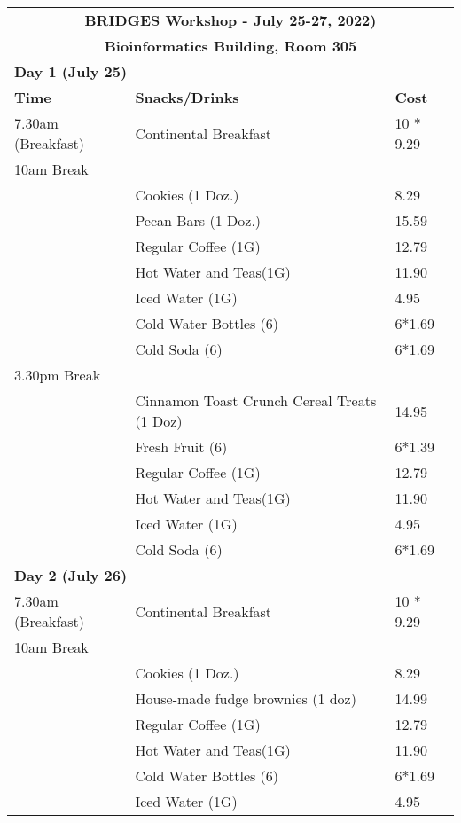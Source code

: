 \documentclass[11pt]{article}
\begin{document}
\begin{table}[htp]
{%
\begin{tabular}{lll} \hline
\multicolumn{3}{c}{\textbf{BRIDGES Workshop - July 25-27, 2022)}}\\ 
\multicolumn{3}{c}{\textbf{Bioinformatics Building, Room 305}} \\\hline\hline
\multicolumn{3}{l}{\textbf{Day 1 (July 25)}}\\ \hline
\textbf{Time}  &  \textbf{Snacks/Drinks} & \textbf{Cost} \\ \hline
7.30am (Breakfast)  &    Continental Breakfast  & 10 * 9.29  \\ \hline
10am Break   &    & \\
        &      Cookies (1 Doz.) &  8.29 \\
        &      Pecan Bars (1 Doz.) &  15.59 \\
		& 	   Regular Coffee (1G) & 12.79 \\
		& 	   Hot Water and Teas(1G) & 11.90 \\ 
        &       Iced Water (1G)& 4.95 \\
		& 	   Cold Water Bottles (6) & 6*1.69 \\
		& 	   Cold Soda  (6) & 6*1.69	\\ \hline
3.30pm Break &  & \\
		&		Cinnamon Toast Crunch Cereal Treats (1 Doz) &  14.95 \\
        &       Fresh Fruit (6)  &  6*1.39 \\
		&	    Regular Coffee (1G) &  12.79 \\
		&	    Hot Water and Teas(1G) & 11.90  \\
        &        Iced Water (1G) & 4.95 \\
		&	    Cold Soda  (6) & 6*1.69	 \\ \hline
\multicolumn{3}{l}{\textbf{Day 2 (July 26)}}\\ \hline
7.30am (Breakfast)  &    Continental Breakfast  & 10 * 9.29  \\ \hline
10am Break   &    & \\
        &      Cookies (1 Doz.) &  8.29 \\
		&      House-made fudge brownies (1 doz) & 14.99 \\
		&	   Regular Coffee (1G) & 12.79 \\
		&	   Hot Water and Teas(1G) & 11.90 \\ 
		&	   Cold Water Bottles (6) & 6*1.69 \\
        &      Iced Water (1G)& 4.95 \\

\end{tabular}}
\end{table}
\end{document}

